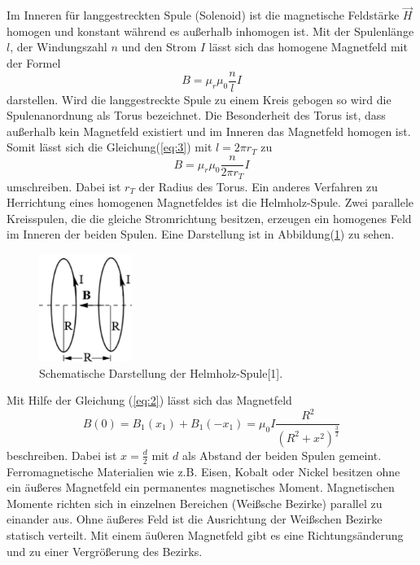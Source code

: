 Im Inneren für langgestreckten Spule (Solenoid) ist die magnetische Feldstärke $\vec{H}$
homogen und konstant während es außerhalb inhomogen ist.
Mit der Spulenlänge $l$, der Windungszahl $n$ und den Strom $I$ lässt sich das
homogene Magnetfeld mit der Formel
\begin{equation}
  B = \mu_r \mu_0 \frac{n}{l} I
  \label{eq:3}
\end{equation}
darstellen. Wird die langgestreckte Spule zu einem Kreis gebogen so wird die Spulenanordnung
als Torus bezeichnet. Die Besonderheit des Torus ist, dass außerhalb kein Magnetfeld
existiert und im Inneren das Magnetfeld homogen ist. Somit lässt sich die Gleichung(\ref{eq:3})
mit $l= 2\pi r_T$ zu
\begin{equation}
  B = \mu_r \mu_0 \frac{n}{2\pi r_T} I
  \label{eq:4}
\end{equation}
umschreiben. Dabei ist $r_T$ der Radius des Torus.
Ein anderes Verfahren zu Herrichtung eines homogenen Magnetfeldes ist die Helmholz-Spule.
Zwei parallele Kreisspulen, die die gleiche Stromrichtung besitzen, erzeugen ein homogenes
Feld im Inneren der beiden Spulen. Eine Darstellung ist in Abbildung(\ref{abb:2}) zu sehen.
\begin{figure}[H]
  \centering
\includegraphics[width =5 cm, height = 3.5cm]{Abb2.png}
\caption{Schematische Darstellung der Helmholz-Spule[1].}
\label{abb:2}
\end{figure}
Mit Hilfe der Gleichung (\ref{eq:2}) lässt sich das Magnetfeld
\begin{equation}
  B(0)=B_1(x_1) + B_1(-x_1) = \mu_0 I \frac{R^2}{(R^2 + x^2)^{\frac{3}{2}}}
  \label{eq:5}
\end{equation}
beschreiben. Dabei ist $x=\frac{d}{2}$ mit $d$ als Abstand der beiden Spulen gemeint.\\
Ferromagnetische Materialien wie z.B. Eisen, Kobalt oder Nickel besitzen ohne ein äußeres Magnetfeld
ein permanentes magnetisches Moment. Magnetischen Momente richten sich in einzelnen Bereichen (Weißsche Bezirke)
parallel zu einander aus. Ohne äußeres Feld ist die Ausrichtung der Weißschen Bezirke statisch verteilt.
Mit einem äu0eren Magnetfeld gibt es eine Richtungsänderung und zu einer Vergrößerung des Bezirks.
